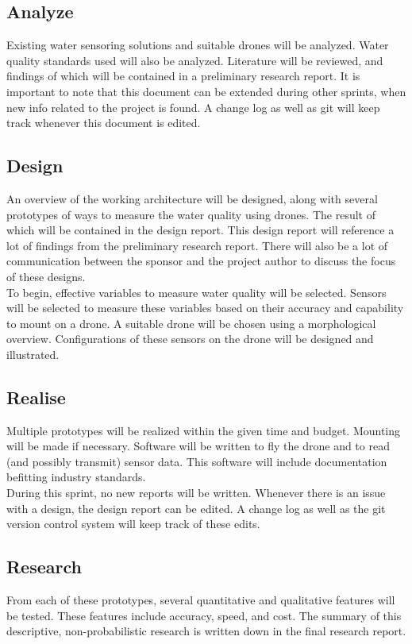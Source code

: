 \documentclass[11pt, a4paper]{article}
\begin{document}
\subsection{Analyze} \label{sprint:analyze}
Existing water sensoring solutions and suitable drones will be analyzed. Water quality standards used will also be analyzed. Literature will be reviewed, and findings of which will be contained in a preliminary research report.  It is important to note that this document can be extended during other sprints, when new info related to the project is found. A change log as well as git \cite{git} will keep track whenever this document is edited.

\subsection{Design} \label{sprint:design}
An overview of the working architecture will be designed, along with several prototypes of ways to measure the water quality using drones. The result of which will be contained in the design report. This design report will reference a lot of findings from the preliminary research report. There will also be a lot of communication between the sponsor and the project author to discuss the focus of these designs. \\

To begin, effective variables to measure water quality will be selected. Sensors will be selected to measure these variables based on their accuracy and capability to mount on a drone. A suitable drone will be chosen using a morphological overview. Configurations of these sensors on the drone will be designed and illustrated. 

\subsection{Realise} \label{sprint:realise}
Multiple prototypes will be realized within the given time and budget. Mounting will be made if necessary. Software will be written to fly the drone and to read (and possibly transmit) sensor data. This software will include documentation befitting industry standards.\\

During this sprint, no new reports will be written. Whenever there is an issue with a design, the design report can be edited. A change log as well as the git version control system \cite{git} will keep track of these edits.

\subsection{Research}
From each of these prototypes, several quantitative and qualitative features will be tested. These features include accuracy, speed, and cost. The summary of this descriptive, non-probabilistic research is written down in the final research report.
\end{document}
